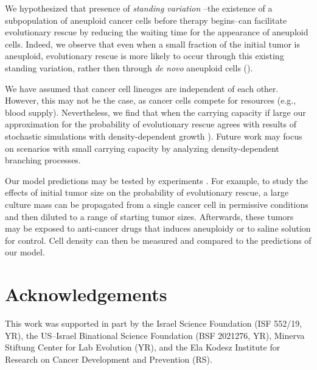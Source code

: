 \documentclass[12pt]{extarticle}
\begin{document}
We hypothesized that presence of \emph{standing variation} %
--the existence of a subpopulation of aneuploid cancer cells before therapy begins--can facilitate evolutionary rescue by reducing the waiting time for the appearance of aneuploid cells. Indeed, we observe that even when a small fraction of the initial tumor is aneuploid, evolutionary rescue is more likely to occur through this existing standing variation, rather then through \emph{de novo} aneuploid cells ().

We have assumed that cancer cell lineages are independent of each other. However, this may not be the case, as cancer cells compete for resources (e.g., blood supply). Nevertheless, we find that when the carrying capacity if large %
our approximation for the probability of evolutionary rescue agrees with results of stochastic simulations with density-dependent growth  ).
Future work may focus on scenarios with small carrying capacity by analyzing density-dependent branching processes. %

Our model predictions may be tested by experiments \citep{martin2013probability}. For example, to study the effects of initial tumor size on the probability of evolutionary rescue, a large culture mass can be propagated from a single cancer cell in permissive conditions and then diluted to a  range of starting tumor sizes. Afterwards, these tumors may be exposed to anti-cancer drugs that induces aneuploidy %
or to saline solution for control. 
Cell density can then be measured and compared to the predictions of our model. %



{\small
\section*{Acknowledgements}
This work was supported in part by
the Israel Science Foundation (ISF 552/19, YR),
the US–Israel Binational Science Foundation (BSF 2021276, YR), 
Minerva Stiftung Center for Lab Evolution (YR), 
and the Ela Kodesz Institute for Research on Cancer Development and Prevention (RS).
}
\end{document}
